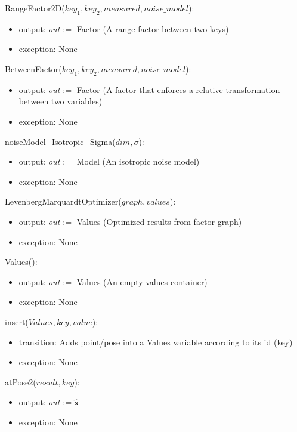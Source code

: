 \documentclass[12pt, titlepage]{article}
\begin{document}
\noindent RangeFactor2D($key_1, key_2, measured, noise\_model$):
\begin{itemize}
    \item output: $out:=$ Factor (A range factor between two keys)
    \item exception: None
\end{itemize}

\noindent BetweenFactor($key_1, key_2, measured, noise\_model$):
\begin{itemize}
    \item output: $out:=$ Factor (A factor that enforces a relative transformation between two variables)
    \item exception: None
\end{itemize}

\noindent noiseModel\_Isotropic\_Sigma($dim, \sigma$):
\begin{itemize}
    \item output: $out:=$ Model (An isotropic noise model)
    \item exception: None
\end{itemize}

\noindent LevenbergMarquardtOptimizer($graph, values$):
\begin{itemize}
    \item output: $out:=$ Values (Optimized results from factor graph)
    \item exception: None
\end{itemize}

\noindent Values():
\begin{itemize}
    \item output: $out:=$ Values (An empty values container)
    \item exception: None
\end{itemize}

\noindent insert($Values, key, value$):
\begin{itemize}
    \item transition: Adds point/pose into a Values variable according to its id (key)
    \item exception: None
\end{itemize}

\noindent atPose2($result, key$):
\begin{itemize}
    \item output: $out:= \mathbf{\hat{x}}$ 
    \item exception: None
\end{itemize}
\end{document}
